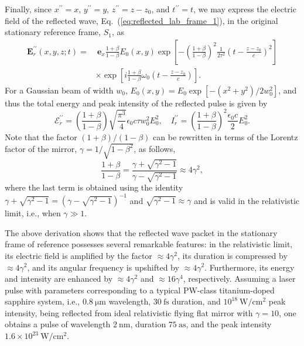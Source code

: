 \documentclass[10pt, a4paper, twoside, openright]{report}
\renewcommand{\vec}[1]{\mathbf{#1}}
\begin{document}
Finally, since $ x^{\prime \prime} = x $, $ y^{\prime \prime} = y $, $ z^{\prime \prime} = z - z_0 $, and $ t^{\prime \prime} = t $,
we may express the electric field of the reflected wave, Eq.~(\ref{eq:reflected_lab_frame_1}), in the original stationary reference frame, $ S_1 $, as
\begin{equation}\label{eq:reflected_lab_frame_2}
\begin{split}
\vec{E}^{\prime \prime}_r \left(x, y, z; t \right) = & \ \vec{e}_x \frac{1 + \beta}{1 - \beta} E_0 \left(x, y \right) \exp \left[ - \left(\frac{1 + \beta}{1 - \beta}\right)^2 \frac{1}{2 \tau^2} \left(t - \frac{z - z_0}{c}\right)^2 \right] \\ 
& \times \exp \left[ i \frac{1 + \beta}{1 - \beta} \omega_0 \left(t - \frac{z - z_0}{c}\right) \right].
\end{split}
\end{equation}
For a Gaussian beam of width $ w_0 $, $ E_0 \left( x, y \right) = E_0 \exp \left[-\left( x^2 + y^2 \right) / 2 w_0^2 \right] $, and thus the total energy and peak intensity of the reflected pulse is given by 
\begin{equation}\label{eq:energy_and_intensity}
\mathcal{E}^{\prime \prime}_r = \left(\frac{1 + \beta}{1 - \beta}\right) \sqrt{\frac{\pi^3}{4}} \epsilon_0 c \tau w_0^2 E_0^2 , \quad I^{\prime \prime}_r = \left(\frac{1 + \beta}{1 - \beta}\right)^2 \frac{\epsilon_0 c}{2} E_0^2.
\end{equation}
Note that the factor $ \left(1 + \beta \right) / \left(1 - \beta \right) $ can be rewritten in terms of the Lorentz factor of the mirror, $ \gamma = 1 / \sqrt{1 - \beta^2} $, as follows,
\begin{equation}\label{eq:factor}
\frac{1 + \beta}{1 - \beta} = \frac{\gamma + \sqrt{\gamma^2 - 1}}{\gamma - \sqrt{\gamma^2 - 1}} \approx 4 \gamma^2,
\end{equation}
where the last term is obtained using the identity $ \gamma + \sqrt{\gamma^2 - 1} = ( \gamma - \sqrt{\gamma^2 - 1} )^{-1} $ and $ \sqrt{\gamma^2 - 1} \approx \gamma $ and is valid in the relativistic limit, i.e., when $ \gamma \gg 1 $.

The above derivation shows that the reflected wave packet in the stationary frame of reference possesses several remarkable features: in the relativistic limit, its electric field is amplified by the factor $ \approx 4 \gamma^2 $, its duration is compressed by $ \approx 4 \gamma^2 $, and its angular frequency is upshifted by $ \approx 4 \gamma^2 $. Furthermore, its energy and intensity are enhanced by $ \approx 4 \gamma^2 $ and $ \approx 16 \gamma^4 $, respectively. Assuming a laser pulse with parameters corresponding to a typical $ \mathrm{PW} $-class titanium-doped sapphire system, i.e., $ 0.8 \ \mathrm{\mu m} $ wavelength, $ 30 \ \mathrm{fs} $ duration, and $ 10^{18} \ \mathrm{W / cm^2} $ peak intensity, being reflected from ideal relativistic flying flat mirror with $ \gamma = 10 $, one obtains a pulse of wavelength $ 2 \ \mathrm{nm} $, duration $ 75 \ \mathrm{as} $, and the peak intensity $ 1.6 \times 10^{23} \ \mathrm{W / cm^2} $.
\end{document}
